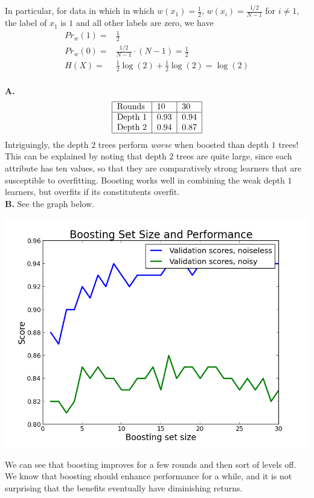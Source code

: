 \documentclass[12pt]{amsart}
\theoremstyle{remark}
\begin{document}
In particular, for data in which in which $w(x_1)=\frac{1}{2}$, $w(x_i)=\frac{1/2}{N-1}$ for $i\ne 1$, the label of $x_1$ is $1$ and all other labels are zero, we have
\begin{align*}
Pr_w(1) =& \frac{1}{2}\\
Pr_w(0) =& \frac{1/2}{N-1}\cdot(N-1)=\frac{1}{2}\\
H(X) = &\frac{1}{2}\log(2)+\frac{1}{2}\log(2) = \log(2)\\
\end{align*}

\textbf{A.} 
\[
\begin{tabular}{|l|l|l|l|}
\hline
 Rounds & 10 & 30 \\
\hline
Depth 1& 0.93 &  0.94 \\
Depth 2 & 0.94 &  0.87\\
\hline
\end{tabular}
\]
Intriguingly, the depth $2$ trees perform \emph{worse} when boosted than depth $1$ trees! This can be explained by noting that depth $2$ trees are quite large, since each attribute has ten values, so that they are comparatively strong learners that are susceptible to overfitting. Boosting works well in combining the weak depth $1$ learners, but overfits if its constitutents overfit. \\

\textbf{B.} See the graph below. 

\includegraphics[scale=.4]{hw1/boostingscores.png}

We can see that boosting improves for a few rounds and then sort of levels off. We know that boosting should enhance performance for a while, and it is not surprising that the benefits eventually have diminishing returns. \\
\end{document}
